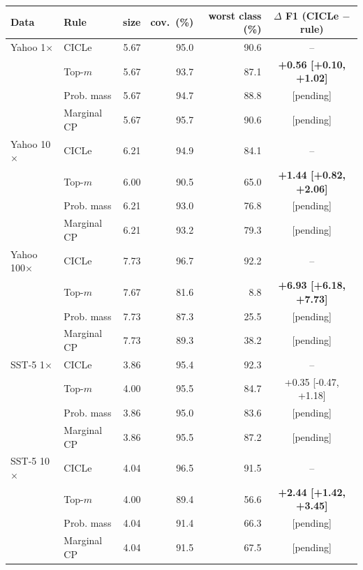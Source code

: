 \begin{tabular}{llrrrc}
\toprule
Data & Rule & size & cov.\ (\%) & worst class (\%) & $\Delta$ F1 (CICLe $-$ rule) \\
\midrule
Yahoo 1$\times$ & CICLe & 5.67 & 95.0 & 90.6 & -- \\
 & Top-$m$ & 5.67 & 93.7 & 87.1 & \textbf{+0.56 [+0.10, +1.02]} \\
 & Prob. mass & 5.67 & 94.7 & 88.8 & [pending] \\
 & Marginal CP & 5.67 & 95.7 & 90.6 & [pending] \\
\addlinespace
Yahoo 10$\times$ & CICLe & 6.21 & 94.9 & 84.1 & -- \\
 & Top-$m$ & 6.00 & 90.5 & 65.0 & \textbf{+1.44 [+0.82, +2.06]} \\
 & Prob. mass & 6.21 & 93.0 & 76.8 & [pending] \\
 & Marginal CP & 6.21 & 93.2 & 79.3 & [pending] \\
\addlinespace
Yahoo 100$\times$ & CICLe & 7.73 & 96.7 & 92.2 & -- \\
 & Top-$m$ & 7.67 & 81.6 & 8.8 & \textbf{+6.93 [+6.18, +7.73]} \\
 & Prob. mass & 7.73 & 87.3 & 25.5 & [pending] \\
 & Marginal CP & 7.73 & 89.3 & 38.2 & [pending] \\
\addlinespace
SST-5 1$\times$ & CICLe & 3.86 & 95.4 & 92.3 & -- \\
 & Top-$m$ & 4.00 & 95.5 & 84.7 & +0.35 [-0.47, +1.18] \\
 & Prob. mass & 3.86 & 95.0 & 83.6 & [pending] \\
 & Marginal CP & 3.86 & 95.5 & 87.2 & [pending] \\
\addlinespace
SST-5 10$\times$ & CICLe & 4.04 & 96.5 & 91.5 & -- \\
 & Top-$m$ & 4.00 & 89.4 & 56.6 & \textbf{+2.44 [+1.42, +3.45]} \\
 & Prob. mass & 4.04 & 91.4 & 66.3 & [pending] \\
 & Marginal CP & 4.04 & 91.5 & 67.5 & [pending] \\

\end{tabular}
